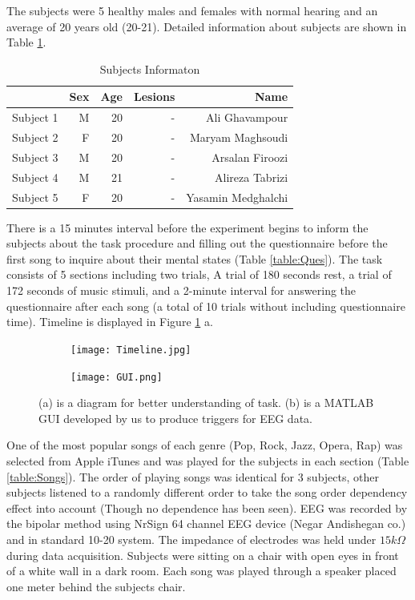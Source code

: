 \documentclass[9pt,twocolumn]{paper-template}
\begin{document}
The subjects were 5 healthy males and females with normal hearing and an average of 20 years old (20-21). Detailed information about subjects are shown in Table \ref{table:SubInf}.\\
\begin{table}[h!]%
\centering
\caption{Subjects Informaton}
\label{table:SubInf}
\begin{tabular}{lrrrr}
 & Sex & Age & Lesions & Name\\
\midrule
Subject 1 & M & 20 & - & Ali Ghavampour\\
Subject 2 & F & 20 & - & Maryam Maghsoudi\\
Subject 3 & M & 20 & - & Arsalan Firoozi\\
Subject 4 & M & 21 & - & Alireza Tabrizi\\
Subject 5 & F & 20 & - &Yasamin Medghalchi\\
\bottomrule
\end{tabular}
\end{table}

There is a 15 minutes interval before the experiment begins to inform the subjects about the task procedure and filling out the questionnaire before the first song to inquire about their mental states (Table \ref{table:Ques}). The task consists of 5 sections including two trials, A trial of 180 seconds rest, a trial of 172 seconds of music stimuli, and a 2-minute interval for answering the questionnaire after each song (a total of 10 trials without including questionnaire time). Timeline is displayed in Figure \ref{fig:Timeline} a. \\


\begin{figure}[h!]
  \centering
  \begin{subfigure}[b]{0.7\linewidth}
    \texttt{[image: Timeline.jpg]}
    \caption{}
  \end{subfigure}
  \begin{subfigure}[b]{0.7\linewidth}
    \texttt{[image: GUI.png]}
    \caption{}
  \end{subfigure}
  \caption{(a) is a diagram for better understanding of task. (b) is a MATLAB GUI developed by us to produce triggers for EEG data.}
  \label{fig:Timeline}
\end{figure}

One of the most popular songs of each genre (Pop, Rock, Jazz, Opera, Rap) was selected from Apple iTunes and was played for the subjects in each section (Table \ref{table:Songs}). The order of playing songs was identical for 3 subjects, other subjects listened to a randomly different order to take the song order dependency effect into account (Though no dependence has been seen). EEG was recorded by the bipolar method using NrSign 64 channel EEG device (Negar Andishegan co.) and in standard 10-20 system. The impedance of electrodes was held under $15k\Omega$ during data acquisition. Subjects were sitting on a chair with open eyes in front of a white wall in a dark room. Each song was played through a speaker placed one meter behind the subject\textquotesingle s chair. \\
\end{document}
